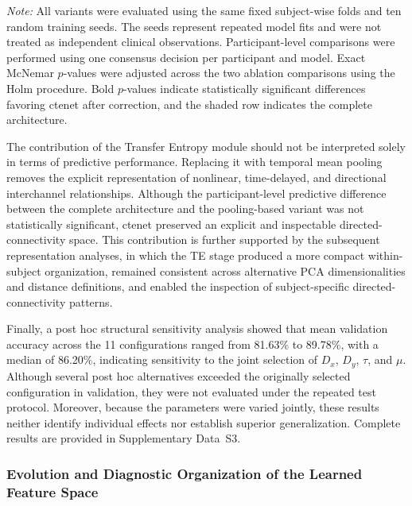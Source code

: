 \begin{table}[H]
\begin{threeparttable}
\begin{tablenotes}[flushleft]
\footnotesize
\item \textit{Note:} All variants were evaluated using the same fixed
subject-wise folds and ten random training seeds. The seeds represent repeated
model fits and were not treated as independent clinical observations.
Participant-level comparisons were performed using one consensus decision per
participant and model. Exact McNemar $p$-values were adjusted across the two
ablation comparisons using the Holm procedure. Bold $p$-values indicate
statistically significant differences favoring \gls{ctenet} after correction, and
the shaded row indicates the complete architecture.
\end{tablenotes}
\end{threeparttable}
\end{table}

{The contribution of the Transfer Entropy module should not be interpreted solely in terms of predictive performance. Replacing it with temporal mean pooling removes the explicit representation of nonlinear, time-delayed, and directional interchannel relationships. Although the participant-level predictive difference between the complete architecture and the pooling-based variant was not statistically significant, \gls{ctenet} preserved an explicit and inspectable directed-connectivity space. This contribution is further supported by the subsequent representation analyses, in which the TE stage produced a more compact within-subject organization, remained consistent across alternative PCA dimensionalities and distance definitions, and enabled the inspection of subject-specific directed-connectivity patterns.}

{Finally, a post hoc structural sensitivity analysis showed that mean
validation accuracy across the 11 configurations ranged from 81.63\% to 89.78\%, with a median of 86.20\%, indicating sensitivity to the joint selection of $D_x$, $D_y$, $\tau$, and $\mu$. Although several post hoc alternatives exceeded the originally selected configuration in validation, they were not evaluated under the repeated test protocol. Moreover, because the parameters were varied jointly, these results neither identify individual effects nor establish superior generalization. Complete results are provided in Supplementary
Data~S3.}

\subsubsection{Evolution and Diagnostic Organization of the Learned Feature Space} \label{subsec:feature_space_evolution}

